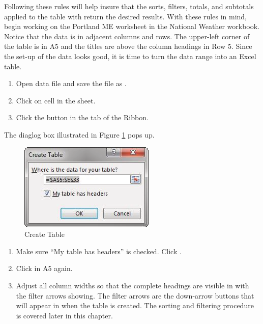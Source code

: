 Following these rules will help insure that the sorts, filters, totals, and subtotals applied to the table with return the desired results. With these rules in mind, begin working on the Portland ME worksheet in the National Weather workbook. Notice that the data is in adjacent columns and rows. The upper-left corner of the table is in \textsf{A5} and the titles are above the column headings in Row $ 5 $. Since the set-up of the data looks good, it is time to turn the data range into an Excel table.

\begin{enumerate}
	\item Open data file  and save the file as .
	\item Click on cell  in the  sheet.
	\item Click the  button in the  tab of the Ribbon.
\end{enumerate}

The diaglog box illustrated in Figure \ref{05:fig02} pops up.

\begin{figure}[H]
	\centering
	\includegraphics[width=\maxwidth{.95\linewidth}]{gfx/ch05_fig02}
	\caption{Create Table}
	\label{05:fig02}
\end{figure}

\begin{enumerate}
	\item Make sure ``My table has headers'' is checked. Click .
	\item Click in A5 again.
	\item Adjust all column widths so that the complete headings are visible in   with the filter arrows showing. The filter arrows are the down-arrow buttons that will appear in  when the table is created. The sorting and filtering procedure is covered later in this chapter.
\end{enumerate}

